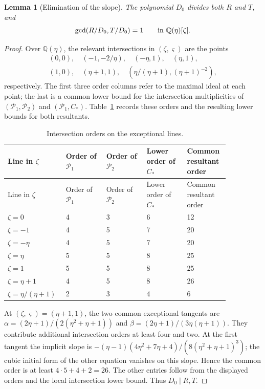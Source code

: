 \documentclass[11pt,a4paper]{article}
\numberwithin{equation}{section}
\theoremstyle{plain}
\newtheorem{lemma}[theorem]{Lemma}
\theoremstyle{definition}
\theoremstyle{remark}
\begin{document}
\begin{lemma}[Elimination of the slope]
\label{r3:contactelimination}
The polynomial $D_0$ divides both $R$ and $T$, and
\[
 \gcd(R/D_0,T/D_0)=1\qquad\hbox{in }\mathbb Q(\eta )[\zeta ].
\]
\end{lemma}
\begin{proof}
Over $\mathbb Q(\eta)$, the relevant intersections in
$(\zeta,\varsigma)$ are the points
\[
\begin{gathered}
(0,0),\quad(-1,-2/\eta),\quad(-\eta,1),\quad(\eta,1),\\
(1,0),\quad(\eta+1,1),\quad
(\eta/(\eta+1),(\eta+1)^{-2}),
\end{gathered}
\]
respectively.
The first three order columns refer to the maximal ideal at each point;
the last is a common lower bound for the intersection multiplicities
of $(\mathcal P_1,\mathcal P_2)$ and $(\mathcal P_1,C_*)$.
Table~\ref{tab:r3-contact-orders} records these orders and the resulting
lower bounds for both resultants.
\begin{longtable}{@{}p{0.172\linewidth}p{0.172\linewidth}p{0.172\linewidth}p{0.172\linewidth}p{0.172\linewidth}@{}}

\caption{Intersection orders on the exceptional lines.}\label{tab:r3-contact-orders}\\
\toprule Line in $\zeta $ & Order of $\mathcal P_1$ & Order of $\mathcal P_2$ & Lower order of $C_*$ & Common resultant order\\\midrule\endfirsthead
\toprule Line in $\zeta $ & Order of $\mathcal P_1$ & Order of $\mathcal P_2$ & Lower order of $C_*$ & Common resultant order\\\midrule\endhead

$\zeta =0$ & 4 & 3 & 6 & 12\\

$\zeta =-1$ & 4 & 5 & 7 & 20\\

$\zeta =-\eta $ & 4 & 5 & 7 & 20\\

$\zeta =\eta $ & 5 & 5 & 8 & 25\\

$\zeta =1$ & 5 & 5 & 8 & 25\\

$\zeta =\eta +1$ & 4 & 5 & 8 & 26\\

$\zeta =\eta /(\eta +1)$ & 2 & 3 & 4 & 6\\

\bottomrule\end{longtable}
At $(\zeta,\varsigma)=(\eta+1,1)$, the two common exceptional tangents
are $\alpha=(2\eta+1)/(2(\eta^2+\eta+1))$ and
$\beta=(2\eta+1)/(3\eta(\eta+1))$.
They contribute additional intersection orders at least four and two.
At the first tangent the implicit slope is
$-(\eta-1)(4\eta^2+7\eta+4)/(8(\eta^2+\eta+1)^3)$;
the cubic initial form of the other equation vanishes on this slope.
Hence the common order is at least $4\cdot5+4+2=26$.
The other entries follow from the displayed orders and the local
intersection lower bound. Thus $D_0\mid R,T$.


\end{proof}
\end{document}
